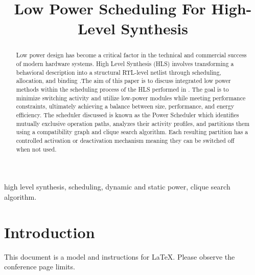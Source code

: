 \documentclass[conference]{IEEEtran}
\begin{document}
\title{Low Power Scheduling For High-Level Synthesis\\
}

\author{
}

\maketitle

\begin{abstract}
Low power design has become a critical factor in the technical and commercial success of modern hardware systems. High Level Synthesis (HLS) involves transforming a behavioral description into a structural RTL-level netlist through scheduling, allocation, and binding \cite{b1} \cite{b2}.The aim of this paper is to discuss integrated low power methods within the scheduling process of the HLS performed in \cite{b3}. The goal is to minimize switching activity and utilize low-power modules while meeting performance constraints, ultimately achieving a balance between size, performance, and energy efficiency. The scheduler discussed is known as the Power Scheduler \cite{b1} which identifies mutually exclusive operation paths, analyzes their activity profiles, and partitions them using a compatibility graph and clique search algorithm. Each resulting partition has a controlled activation or deactivation mechanism meaning they can be switched off when not used. 
\end{abstract}
\begin{IEEEkeywords}
high level synthesis, scheduling, dynamic and static power, clique search algorithm.
\end{IEEEkeywords}

\section{Introduction}
This document is a model and instructions for \LaTeX.
Please observe the conference page limits. 
\end{document}
